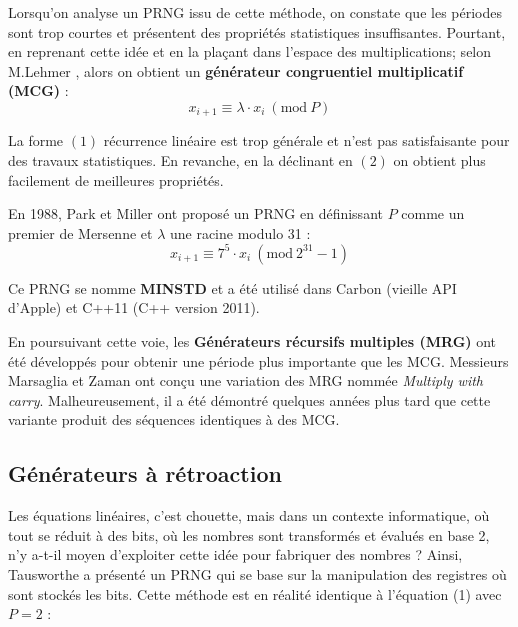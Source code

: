 \documentclass[9pt,a4paper,twoside,english]{class/backend}
\begin{document}
    Lorsqu'on analyse un PRNG issu de cette méthode, on constate que les  périodes sont trop courtes et présentent des propriétés statistiques insuffisantes. Pourtant, en reprenant cette idée et en la plaçant dans l'espace des multiplications; selon M.Lehmer \cite{lehmer}, alors on obtient un \textbf{générateur congruentiel multiplicatif (MCG)} :
        \begin{equation}
            x_{i+1} \equiv \lambda \cdot x_i \ (\text{mod} \ P)
        \end{equation}

    La forme $(1)$ récurrence linéaire est trop générale et n'est pas satisfaisante pour des travaux statistiques. En revanche, en la déclinant en $(2)$ on obtient plus facilement de meilleures propriétés.
    
     En 1988, Park et Miller \cite{ParkMiller} ont proposé un PRNG en définissant $P$ comme un premier de Mersenne et $\lambda$ une racine modulo 31 :
        \begin{equation}
            x_{i+1} \equiv 7^5 \cdot x_i \ (\text{mod} \ 2^{31} - 1)
        \end{equation}
    
    Ce PRNG se nomme \textbf{MINSTD} et a été utilisé dans Carbon (vieille API d'Apple) et C++11 (C++ version 2011).
    
    
    En poursuivant cette voie, les \textbf{Générateurs récursifs multiples (MRG)} ont été développés pour obtenir une période plus importante que les MCG. Messieurs Marsaglia et Zaman \cite{Multiply&Carry} ont conçu une variation des MRG nommée \textit{Multiply with carry}. Malheureusement, il a été démontré quelques années plus tard que cette variante produit des séquences identiques à des MCG.
    
    \subsection{Générateurs à rétroaction}\smallskip

    \hspace{10pt}Les équations linéaires, c'est chouette, mais dans un contexte informatique, où tout se réduit à des bits, où les nombres sont transformés et évalués en base 2, n'y a-t-il moyen d'exploiter cette idée pour fabriquer des nombres ?
    Ainsi, Tausworthe a présenté un PRNG \cite{Tausworthe} qui se base sur la manipulation des registres où sont stockés les bits. Cette méthode est en réalité identique à l'équation (1) avec $P = 2$ :
    
\end{document}
